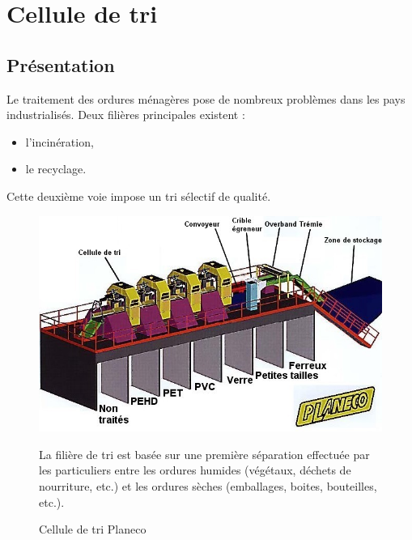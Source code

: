 \newpage

\section{Cellule de tri}

\subsection{Présentation}

Le traitement des ordures ménagères pose de nombreux problèmes dans les pays industrialisés.
Deux filières principales existent :
\begin{itemize}
 \item l'incinération,
 \item le recyclage.
\end{itemize}

Cette deuxième voie impose un tri sélectif de qualité. 

\begin{figure}[htbp]
\begin{minipage}[c]{.50\linewidth}
\begin{center}
\includegraphics[width=0.9\linewidth]{img/planeco.jpg}
\caption{Cellule de tri Planeco}
\label{fig:image109}
\end{center}
\end{minipage}
\hfill
\begin{minipage}[c]{.45\linewidth}
La filière de tri est basée sur une première séparation effectuée par les particuliers entre les ordures humides (végétaux, déchets de nourriture, etc.) et les ordures sèches (emballages, boites, bouteilles, etc.).
\end{minipage}
\end{figure}


